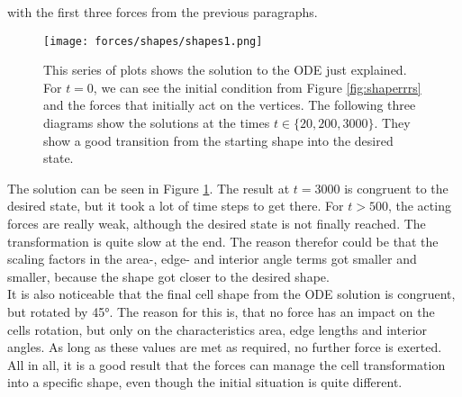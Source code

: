 \documentclass[a4paper,12pt,leqno]{article}
\theoremstyle{plain}
\theoremstyle{remark}
\begin{document}
with the first three forces from the previous paragraphs. 
\begin{figure}[h!]
	\begin{center}
		\texttt{[image: forces/shapes/shapes1.png]}
		\caption{This series of plots shows the solution to the ODE just explained. For $t=0$, we can see the initial condition from Figure \ref{fig:shaperrrs} and the forces that initially act on the vertices. The following three diagrams show the solutions at the times $t \in \{20, 200, 3000\}$. They show a good transition from the starting shape into the desired state. }
		\label{fig:shapeShifteros}
	\end{center}
\end{figure}
The solution can be seen in Figure \ref{fig:shapeShifteros}. The result at $t=3000$ is congruent to the desired state, but it took a lot of time steps to get there. For $t>500$, the acting forces are really weak, although the desired state is not finally reached. The transformation is quite slow at the end. The reason therefor could be that the scaling factors in the area-, edge- and interior angle terms got smaller and smaller, because the shape got closer to the desired shape.\\
It is also noticeable that the final cell shape from the ODE solution is congruent, but rotated by 45°. The reason for this is, that no force has an impact on the cells rotation, but only on the characteristics area, edge lengths and interior angles. As long as these values are met as required, no further force is exerted. \\
All in all, it is a good result that the forces can manage the cell transformation into a specific shape, even though the initial situation is quite different. \\
\end{document}

